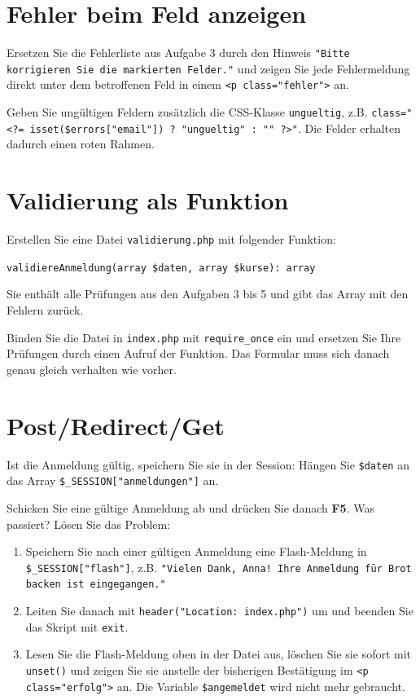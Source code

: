 \documentclass[a4paper,12pt]{article}
\begin{document}
\section{Fehler beim Feld anzeigen}

Ersetzen Sie die Fehlerliste aus Aufgabe 3 durch den Hinweis \texttt{"{}Bitte korrigieren Sie die markierten Felder."{}} und zeigen Sie jede Fehlermeldung direkt unter dem betroffenen Feld in einem \texttt{<p class="{}fehler"{}>} an.

Geben Sie ungültigen Feldern zusätzlich die CSS-Klasse \texttt{ungueltig}, z.B. \texttt{class="{}<?= isset(\$errors["{}email"{}]) ? "{}ungueltig"{} : "{}"{} ?>"{}}. Die Felder erhalten dadurch einen roten Rahmen.

\section{Validierung als Funktion}

Erstellen Sie eine Datei \texttt{validierung.php} mit folgender Funktion:

\texttt{validiereAnmeldung(array \$daten, array \$kurse): array}

Sie enthält alle Prüfungen aus den Aufgaben 3 bis 5 und gibt das Array mit den Fehlern zurück.

Binden Sie die Datei in \texttt{index.php} mit \texttt{require\_once} ein und ersetzen Sie Ihre Prüfungen durch einen Aufruf der Funktion. Das Formular muss sich danach genau gleich verhalten wie vorher.

\section{Post/Redirect/Get}

Ist die Anmeldung gültig, speichern Sie sie in der Session: Hängen Sie \texttt{\$daten} an das Array \texttt{\$\_SESSION["{}anmeldungen"{}]} an.

Schicken Sie eine gültige Anmeldung ab und drücken Sie danach \textbf{F5}. Was passiert? Lösen Sie das Problem:

\begin{enumerate}
    \item Speichern Sie nach einer gültigen Anmeldung eine Flash-Meldung in \texttt{\$\_SESSION["{}flash"{}]}, z.B. \texttt{"{}Vielen Dank, Anna! Ihre Anmeldung für Brot backen ist eingegangen."{}}
    \item Leiten Sie danach mit \texttt{header("{}Location: index.php"{})} um und beenden Sie das Skript mit \texttt{exit}.
    \item Lesen Sie die Flash-Meldung oben in der Datei aus, löschen Sie sie sofort mit \texttt{unset()} und zeigen Sie sie anstelle der bisherigen Bestätigung im \texttt{<p class="{}erfolg"{}>} an. Die Variable \texttt{\$angemeldet} wird nicht mehr gebraucht.
\end{enumerate}
\end{document}

